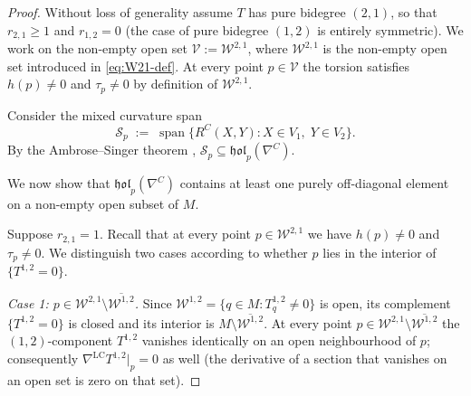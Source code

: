 \documentclass[11pt,reqno]{amsart}
\theoremstyle{plain}
\theoremstyle{definition}
\numberwithin{equation}{section}
\begin{document}
\begin{proof}
Without loss of generality assume $T$ has pure bidegree $(2,1)$, so that $r_{2,1} \geq 1$ and $r_{1,2} = 0$ (the case of pure bidegree $(1,2)$ is entirely symmetric).  We work on the non-empty open set $\mathcal{V} := \mathcal{W}^{2,1}$, where $\mathcal{W}^{2,1}$ is the
non-empty open set introduced in \ref{eq:W21-def}. At every point $p \in \mathcal{V}$ the torsion satisfies $h(p) \neq 0$ and $\tau_p \neq 0$ by definition of $\mathcal{W}^{2,1}$.

Consider the mixed curvature span
\[
  \mathcal{S}_p
  \;:=\;
  \operatorname{span}\bigl\{
    R^C(X,Y) : X\in V_1,\; Y\in V_2
  \bigr\}.
\]
By the Ambrose--Singer theorem \cite{A-S (1953)},
$\mathcal{S}_p
\subseteq\mathfrak{hol}_p(\nabla^C)$.

We now show that $\mathfrak{hol}_p(\nabla^C)$ contains
at least one purely off-diagonal element on a non-empty open
subset of $M$.

Suppose $r_{2,1}=1$.
Recall that at every point $p\in\mathcal{W}^{2,1}$ we have
$h(p)\neq 0$ and $\tau_p\neq 0$.
We distinguish two cases according to whether $p$ lies in the
interior of $\{T^{1,2}=0\}$.

\medskip
\noindent\textit{Case 1: $p\in\mathcal{W}^{2,1}\setminus
\overline{\mathcal{W}^{1,2}}$.}
Since $\mathcal{W}^{1,2}=\{q\in M:T^{1,2}_q\neq 0\}$ is open,
its complement $\{T^{1,2}=0\}$ is closed and its interior is
$M\setminus\overline{\mathcal{W}^{1,2}}$.  At every point
$p\in\mathcal{W}^{2,1}\setminus\overline{\mathcal{W}^{1,2}}$
the $(1,2)$-component $T^{1,2}$ vanishes identically on an open
neighbourhood of $p$; consequently
$\nabla^{\mathrm{LC}}T^{1,2}\big|_p=0$ as well
(the derivative of a section that vanishes on an open set is zero
on that set).


\end{proof}
\end{document}

